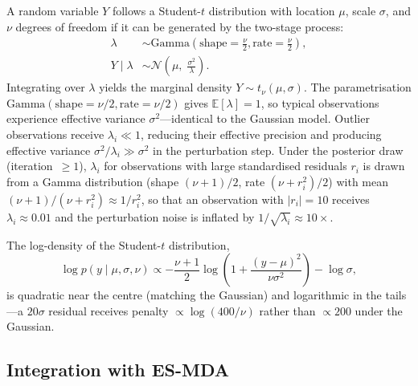 \documentclass[article,nojss]{jss}
\begin{document}
A random variable $Y$ follows a Student-$t$ distribution with location
$\mu$, scale $\sigma$, and $\nu$ degrees of freedom if it can be
generated by the two-stage process:
\begin{align}
\lambda &\sim \text{Gamma}(\text{shape}=\frac{\nu}{2}, \text{rate}=\frac{\nu}{2}), \\
Y \mid \lambda &\sim \mathcal{N}\!\left(\mu,\; \frac{\sigma^2}{\lambda}\right).
\label{eq:scale_mixture}
\end{align}
Integrating over $\lambda$ yields the marginal density
$Y \sim t_\nu(\mu, \sigma)$.
The parametrisation $\text{Gamma}(\text{shape}=\nu/2, \text{rate}=\nu/2)$ gives
$\mathbb{E}[\lambda] = 1$, so typical observations experience effective
variance $\sigma^2$---identical to the Gaussian model.
Outlier observations receive $\lambda_i \ll 1$, reducing their effective
precision and producing effective variance $\sigma^2 / \lambda_i \gg
\sigma^2$ in the perturbation step.
Under the posterior draw (iteration~$\ge 1$), $\lambda_i$ for
observations with large standardised residuals $r_i$ is drawn from a
Gamma distribution (shape $(\nu+1)/2$, rate $(\nu+r_i^2)/2$) with mean $(\nu+1)/(\nu+r_i^2) \approx 1/r_i^2$,
so that an observation with $|r_i| = 10$ receives $\lambda_i \approx
0.01$ and the perturbation noise is inflated by $1/\sqrt{\lambda_i}
\approx 10\times$.

The log-density of the Student-$t$ distribution,
\begin{equation}
\log p(y \mid \mu, \sigma, \nu) \propto
-\frac{\nu+1}{2} \log\!\left(1 + \frac{(y-\mu)^2}{\nu\sigma^2}\right)
- \log\sigma,
\end{equation}
is quadratic near the centre (matching the Gaussian) and logarithmic in
the tails---a $20\sigma$ residual receives penalty $\propto \log(400/\nu)$
rather than $\propto 200$ under the Gaussian.

\subsection{Integration with ES-MDA}
\end{document}
